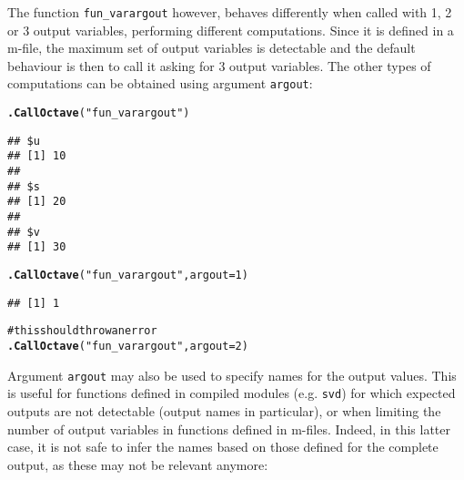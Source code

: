 \documentclass[english,10pt,a4paper]{article}\usepackage{graphicx, color}
\makeatletter
\newcommand{\hlfunctioncall}[1]{\textcolor[rgb]{0.501960784313725,0,0.329411764705882}{\textbf{#1}}}%
\newcommand{\hlstring}[1]{\textcolor[rgb]{0.6,0.6,1}{#1}}%
\newcommand{\hlcomment}[1]{\textcolor[rgb]{0.180392156862745,0.6,0.341176470588235}{#1}}%
\newenvironment{kframe}{%
 \def\at@end@of@kframe{}%
 \ifinner\ifhmode%
  \def\at@end@of@kframe{\end{minipage}}%
  \begin{minipage}{\columnwidth}%
 \fi\fi%
 \def\FrameCommand##1{\hskip\@totalleftmargin \hskip-\fboxsep
 \colorbox{shadecolor}{##1}\hskip-\fboxsep
     \hskip-\linewidth \hskip-\@totalleftmargin \hskip\columnwidth}%
 \MakeFramed {\advance\hsize-\width
   \@totalleftmargin\z@ \linewidth\hsize
   \@setminipage}}%
 {\par\unskip\endMakeFramed%
 \at@end@of@kframe}
\newenvironment{knitrout}{}{} %
\let\code=\texttt
\makeatother
\begin{document}
The function \code{fun\_varargout} however, behaves differently when called
with 1, 2 or 3 output variables, performing different computations.
Since it is defined in a m-file, the maximum set of output variables is
detectable and the default behaviour is then to call it asking for 3 output
variables.
The other types of computations can be obtained using argument \code{argout}:

\begin{knitrout}
\color{fgcolor}\begin{kframe}
\begin{alltt}
\hlfunctioncall{.CallOctave}(\hlstring{"fun_varargout"})
\end{alltt}
\begin{verbatim}
## $u
## [1] 10
## 
## $s
## [1] 20
## 
## $v
## [1] 30
\end{verbatim}
\begin{alltt}
\hlfunctioncall{.CallOctave}(\hlstring{"fun_varargout"}, argout = 1)
\end{alltt}
\begin{verbatim}
## [1] 1
\end{verbatim}
\begin{alltt}
\hlcomment{# this should throw an error}
\hlfunctioncall{.CallOctave}(\hlstring{"fun_varargout"}, argout = 2)
\end{alltt}


{\ttfamily\noindent\bfseries\color{errorcolor}{\#\# Error: RcppOctave - error in Octave function `fun\_varargout`.}}\end{kframe}
\end{knitrout}


Argument \code{argout} may also be used to specify names for the output values.
This is useful for functions defined in compiled modules (e.g. \code{svd}) for
which expected outputs are not detectable (output names in particular), or when
limiting the number of output variables in functions defined in m-files.
Indeed, in this latter case, it is not safe to infer the names based on those
defined for the complete output, as these may not be relevant anymore:
\end{document}
